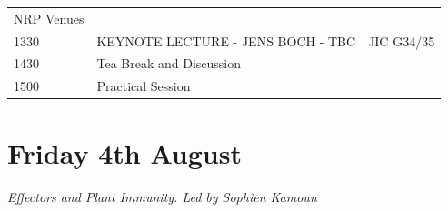 \documentclass[12pt,]{book}
\begin{document}
\begin{longtable}[]{@{}lll@{}}
\begin{minipage}[t]{0.13\columnwidth}
NRP Venues\strut
\end{minipage}\tabularnewline
\begin{minipage}[t]{0.09\columnwidth}\raggedright\strut
1330\strut
\end{minipage} & \begin{minipage}[t]{0.38\columnwidth}\raggedright\strut
KEYNOTE LECTURE - JENS BOCH - TBC\strut
\end{minipage} & \begin{minipage}[t]{0.13\columnwidth}\raggedright\strut
JIC G34/35\strut
\end{minipage}\tabularnewline
\begin{minipage}[t]{0.09\columnwidth}\raggedright\strut
1430\strut
\end{minipage} & \begin{minipage}[t]{0.38\columnwidth}\raggedright\strut
Tea Break and Discussion\strut
\end{minipage} & \begin{minipage}[t]{0.13\columnwidth}\raggedright\strut
\strut
\end{minipage}\tabularnewline
\begin{minipage}[t]{0.09\columnwidth}\raggedright\strut
1500\strut
\end{minipage} & \begin{minipage}[t]{0.38\columnwidth}\raggedright\strut
Practical Session\strut
\end{minipage} & \begin{minipage}[t]{0.13\columnwidth}\raggedright\strut
\strut
\end{minipage}\tabularnewline
\bottomrule
\end{longtable}

\section*{Friday 4th August}\label{friday-4th-august}

\emph{Effectors and Plant Immunity. Led by Sophien Kamoun}
\end{document}
